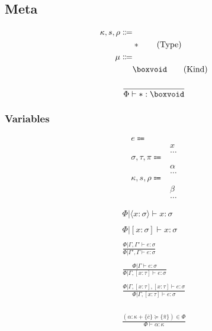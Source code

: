 \documentclass {article}
\begin{document}
\subsection{Meta}
\begin{align*}
\kappa, s, \rho \Coloneqq & \\
& * \tag{Type} \\
\mu \Coloneqq & \\
& \boxvoid \tag{Kind} \\
\end{align*}

\begin{gather*}
\frac
{}
{\Phi \vdash * : \boxvoid} \\
\end{gather*}


\subsubsection{Variables}
\begin{align*}
e \Coloneqq & \\
& x \tag{Variable} \\
& \dots \\
\sigma, \tau, \pi \Coloneqq & \\
& \alpha \tag{Type Variable} \\
& \dots \\
\kappa, s, \rho \Coloneqq & \\
& \beta \tag{Kind Variable} \\
& \dots
\end{align*}

\begin{gather*}
\Phi | \langle x : \sigma \rangle \vdash x : \sigma \\
\\
\Phi | [ x : \sigma ] \vdash x : \sigma \\
\\
\frac
{\Phi | \Gamma, \Gamma' \vdash e : \sigma}
{\Phi | \Gamma', \Gamma \vdash e : \sigma} \\
\\
\frac
{\Phi | \Gamma \vdash e : \sigma}
{\Phi | \Gamma, [ x : \tau ] \vdash e : \sigma } \\
\\
\frac
{\Phi | \Gamma, [x : \tau], [x : \tau] \vdash e : \sigma}
{\Phi | \Gamma, [x : \tau] \vdash e : \sigma } \\
\end{gather*}

\begin{gather*}
\frac
{(\alpha : \kappa + \{ \overline c \} \succeq \{ \overline \pi \} ) \in \Phi}
{\Phi \vdash \alpha : \kappa}
\end{gather*}
\end{document}
